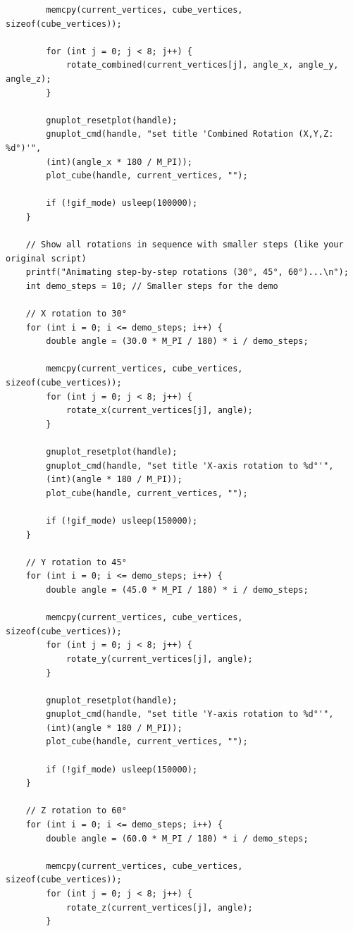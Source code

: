 \documentclass[a4paper,10pt]{article}
\begin{document}
\begin{verbatim}
        memcpy(current_vertices, cube_vertices, sizeof(cube_vertices));

        for (int j = 0; j < 8; j++) {
            rotate_combined(current_vertices[j], angle_x, angle_y, angle_z);
        }

        gnuplot_resetplot(handle);
        gnuplot_cmd(handle, "set title 'Combined Rotation (X,Y,Z: %d°)'",
        (int)(angle_x * 180 / M_PI));
        plot_cube(handle, current_vertices, "");

        if (!gif_mode) usleep(100000);
    }

    // Show all rotations in sequence with smaller steps (like your original script)
    printf("Animating step-by-step rotations (30°, 45°, 60°)...\n");
    int demo_steps = 10; // Smaller steps for the demo

    // X rotation to 30°
    for (int i = 0; i <= demo_steps; i++) {
        double angle = (30.0 * M_PI / 180) * i / demo_steps;

        memcpy(current_vertices, cube_vertices, sizeof(cube_vertices));
        for (int j = 0; j < 8; j++) {
            rotate_x(current_vertices[j], angle);
        }

        gnuplot_resetplot(handle);
        gnuplot_cmd(handle, "set title 'X-axis rotation to %d°'",
        (int)(angle * 180 / M_PI));
        plot_cube(handle, current_vertices, "");

        if (!gif_mode) usleep(150000);
    }

    // Y rotation to 45°
    for (int i = 0; i <= demo_steps; i++) {
        double angle = (45.0 * M_PI / 180) * i / demo_steps;

        memcpy(current_vertices, cube_vertices, sizeof(cube_vertices));
        for (int j = 0; j < 8; j++) {
            rotate_y(current_vertices[j], angle);
        }

        gnuplot_resetplot(handle);
        gnuplot_cmd(handle, "set title 'Y-axis rotation to %d°'",
        (int)(angle * 180 / M_PI));
        plot_cube(handle, current_vertices, "");

        if (!gif_mode) usleep(150000);
    }

    // Z rotation to 60°
    for (int i = 0; i <= demo_steps; i++) {
        double angle = (60.0 * M_PI / 180) * i / demo_steps;

        memcpy(current_vertices, cube_vertices, sizeof(cube_vertices));
        for (int j = 0; j < 8; j++) {
            rotate_z(current_vertices[j], angle);
        }


\end{verbatim}
\end{document}
